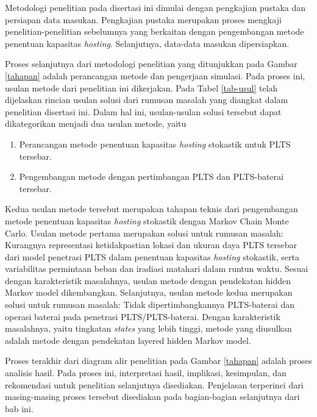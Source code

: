 Metodologi penelitian pada disertasi ini dimulai dengan pengkajian pustaka dan persiapan data masukan. Pengkajian pustaka merupakan proses mengkaji penelitian-penelitian sebelumnya yang berkaitan dengan pengembangan metode penentuan kapasitas \textit{\textit{hosting}}. Selanjutnya, data-data masukan dipersiapkan.

Proses selanjutnya dari metodologi penelitian yang ditunjukkan pada Gambar \ref{tahapan} adalah perancangan metode dan pengerjaan simulasi. Pada proses ini, usulan metode dari penelitian ini dikerjakan. Pada Tabel \ref{tab-usul} telah dijelaskan rincian usulan solusi dari rumusan masalah yang diangkat dalam penelitian disertasi ini. Dalam hal ini, usulan-usulan solusi tersebut dapat dikategorikan menjadi dua usulan metode, yaitu
\begin{enumerate}
	\item Perancangan metode penentuan kapasitas \textit{hosting} stokastik untuk PLTS tersebar.
	\item Pengembangan metode dengan pertimbangan PLTS dan PLTS-baterai tersebar.
\end{enumerate}
Kedua usulan metode tersebut merupakan tahapan teknis dari pengembangan metode penentuan kapasitas \textit{hosting} stokastik dengan Markov Chain Monte Carlo. Usulan metode pertama merupakan solusi untuk rumusan masalah: Kurangnya representasi ketidakpastian lokasi dan ukuran daya PLTS tersebar dari model penetrasi PLTS dalam penentuan kapasitas \textit{hosting} stokastik, serta variabilitas permintaan beban dan iradiasi matahari dalam runtun waktu. Sesuai dengan karakteristik masalahnya, usulan metode dengan pendekatan hidden Markov model dikembangkan. Selanjutnya, usulan metode kedua merupakan solusi untuk rumusan masalah: Tidak dipertimbangkannya PLTS-baterai dan operasi baterai pada penetrasi PLTS/PLTS-baterai. Dengan karakteristik masalahnya, yaitu tingkatan \textit{states} yang lebih tinggi, metode yang diusulkan adalah metode dengan pendekatan layered hidden Markov model.

Proses terakhir dari diagram alir penelitian pada Gambar \ref{tahapan} adalah proses analisis hasil. Pada proses ini, interpretasi hasil, implikasi, kesimpulan, dan rekomendasi untuk penelitian selanjutnya disediakan. Penjelasan terperinci dari masing-masing proses tersebut disediakan pada bagian-bagian selanjutnya dari bab ini.


